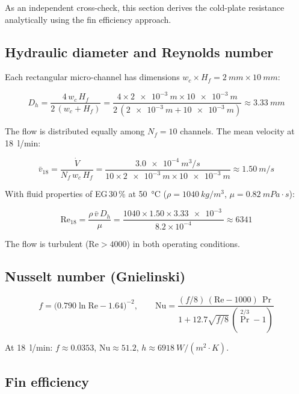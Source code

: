 \documentclass[a4paper,11pt]{article}
\begin{document}
As an independent cross-check, this section derives the cold-plate resistance
analytically using the fin efficiency approach.

\subsection{Hydraulic diameter and Reynolds number}

Each rectangular micro-channel has dimensions $w_c \times H_f = \SI{2}{mm}\times\SI{10}{mm}$:

\begin{equation}
  D_{h} = \frac{4\,w_c\,H_f}{2\,(w_c + H_f)}
        = \frac{4\times\SI{2e-3}{m}\times\SI{10e-3}{m}}{2\,(\SI{2e-3}{m}+\SI{10e-3}{m})}
        \approx \SI{3.33}{mm}
\end{equation}

The flow is distributed equally among $N_f = 10$ channels. The mean velocity at
\SI{18}{l/min}:

\begin{equation}
  \bar{v}_{18} = \frac{\dot{V}}{N_f\,w_c\,H_f}
   = \frac{\SI{3.0e-4}{m^3/s}}{10\times\SI{2e-3}{m}\times\SI{10e-3}{m}}
   \approx \SI{1.50}{m/s}
\end{equation}

With fluid properties of EG\,30\,\% at \SI{50}{\celsius}
($\rho=\SI{1040}{kg/m^3}$, $\mu=\SI{0.82}{mPa\cdot s}$):

\begin{equation}
  \mathrm{Re}_{18} = \frac{\rho\,\bar{v}\,D_h}{\mu}
    = \frac{1040 \times 1.50 \times \SI{3.33e-3}{}}{{8.2\times10^{-4}}}
    \approx 6341
\end{equation}

The flow is turbulent ($\mathrm{Re} > 4000$) in both operating conditions.

\subsection{Nusselt number (Gnielinski)}

\begin{equation}
  f = \bigl(0.790\ln\mathrm{Re} - 1.64\bigr)^{-2}, \qquad
  \mathrm{Nu} = \frac{(f/8)\,(\mathrm{Re}-1000)\,\Pr}
                     {1+12.7\sqrt{f/8}\,(\Pr^{2/3}-1)}
\end{equation}

At \SI{18}{l/min}: $f \approx 0.0353$, $\mathrm{Nu} \approx 51.2$,
$h \approx \SI{6918}{W/(m^2\cdot K)}$.

\subsection{Fin efficiency}
\end{document}
